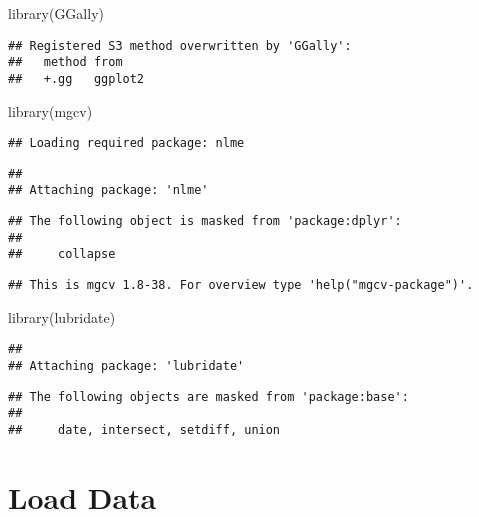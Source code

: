 \documentclass[
]{article}
\newenvironment{Shaded}{\begin{snugshade}}{\end{snugshade}}
\newcommand{\FunctionTok}[1]{\textcolor[rgb]{0.00,0.00,0.00}{#1}}
\newcommand{\NormalTok}[1]{#1}
\begin{document}
\begin{Shaded}
\begin{Highlighting}[]
\FunctionTok{library}\NormalTok{(GGally)}
\end{Highlighting}
\end{Shaded}

\begin{verbatim}
## Registered S3 method overwritten by 'GGally':
##   method from   
##   +.gg   ggplot2
\end{verbatim}

\begin{Shaded}
\begin{Highlighting}[]
\FunctionTok{library}\NormalTok{(mgcv)}
\end{Highlighting}
\end{Shaded}

\begin{verbatim}
## Loading required package: nlme
\end{verbatim}

\begin{verbatim}
## 
## Attaching package: 'nlme'
\end{verbatim}

\begin{verbatim}
## The following object is masked from 'package:dplyr':
## 
##     collapse
\end{verbatim}

\begin{verbatim}
## This is mgcv 1.8-38. For overview type 'help("mgcv-package")'.
\end{verbatim}

\begin{Shaded}
\begin{Highlighting}[]
\FunctionTok{library}\NormalTok{(lubridate)}
\end{Highlighting}
\end{Shaded}

\begin{verbatim}
## 
## Attaching package: 'lubridate'
\end{verbatim}

\begin{verbatim}
## The following objects are masked from 'package:base':
## 
##     date, intersect, setdiff, union
\end{verbatim}

\hypertarget{load-data}{%
\section{Load Data}\label{load-data}}
\end{document}
